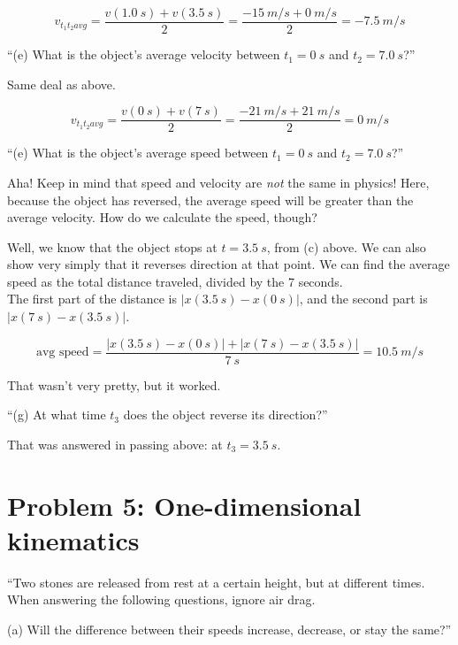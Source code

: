 \documentclass[8.01x]{subfiles}
\begin{document}
\begin{equation}
v_{t_1 t_2 avg} = \frac{v(\SI{1.0}{s}) + v(\SI{3.5}{s})}{2} = \frac{\SI{-15}{m/s} + \SI{0}{m/s}}{2} = \SI{-7.5}{m/s}
\end{equation}

``(e) What is the object's average velocity between $t_1 = \SI{0}{s}$ and $t_2 = \SI{7.0}{s}$?''

Same deal as above.

\begin{equation}
v_{t_1 t_2 avg} = \frac{v(\SI{0}{s}) + v(\SI{7}{s})}{2} = \frac{\SI{-21}{m/s} + \SI{21}{m/s}}{2} = \SI{0}{m/s}
\end{equation}

``(e) What is the object's average speed between $t_1 = \SI{0}{s}$ and $t_2 = \SI{7.0}{s}$?''

Aha! Keep in mind that speed and velocity are \emph{not} the same in physics! Here, because the object has reversed, the average speed will be greater than the average velocity. How do we calculate the speed, though?

Well, we know that the object stops at $t = \SI{3.5}{s}$, from (c) above. We can also show very simply that it reverses direction at that point.
We can find the average speed as the total distance traveled, divided by the 7 seconds.\\
The first part of the distance is $|x(\SI{3.5}{s}) - x(\SI{0}{s})|$, and the second part is $|x(\SI{7}{s}) - x(\SI{3.5}{s})|$.

\begin{equation}
\text{avg speed} = \frac{|x(\SI{3.5}{s}) - x(\SI{0}{s})| + |x(\SI{7}{s}) - x(\SI{3.5}{s})|}{\SI{7}{s}} = \SI{10.5}{m/s}
\end{equation}

That wasn't very pretty, but it worked.

``(g) At what time $t_3$ does the object reverse its direction?''

That was answered in passing above: at $t_3 = \SI{3.5}{s}$.

\section{Problem 5: One-dimensional kinematics}

``Two stones are released from rest at a certain height, but at different times. When answering the following questions, ignore air drag.

(a) Will the difference between their speeds increase, decrease, or stay the same?''
\end{document}
